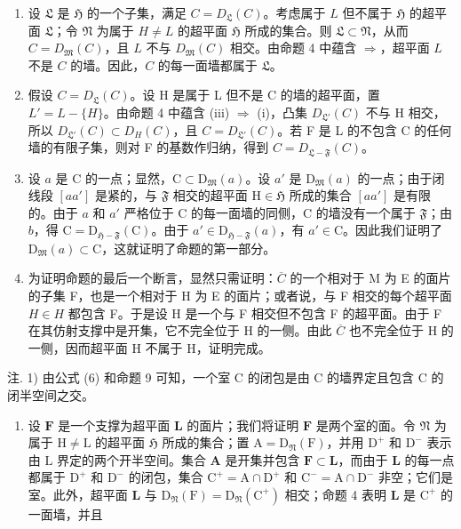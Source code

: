 \begin{enumerate}
\def\labelenumi{\alph{enumi})}
\item
  设 \(\mathfrak{L}\) 是 \(\mathfrak{H}\) 的一个子集，满足 \(C = D_{\mathfrak{L}}(C)\)。考虑属于 \(L\) 但不属于 \(\mathfrak{H}\) 的超平面 \(\mathfrak{L}\)；令 \(\mathfrak{N}\) 为属于 \(H \neq L\) 的超平面 \(\mathfrak{H}\) 所成的集合。则 \(\mathfrak{L} \subset \mathfrak{N}\)，从而 \(C = D_{\mathfrak{M}}(C)\)，且 \(L\) 不与 \(D_{\mathfrak{M}}(C)\) 相交。由命题 4 中蕴含 \(\Longrightarrow\)，超平面 \(L\) 不是 \(C\) 的墙。因此，\(C\) 的每一面墙都属于 \(\mathfrak{L}\)。
\item
  假设 \(C = D_{\mathfrak{L}}(C)\)。设 H 是属于 L 但不是 C 的墙的超平面，置 \(L' = L - \{H\}\)。由命题 4 中蕴含 (iii) \(\Longrightarrow\) (i)，凸集 \(D_{\mathfrak{L}'}(C)\) 不与 H 相交，所以 \(D_{\mathfrak{L}'}(C) \subset D_{H}(C)\)，且 \(C = D_{\mathfrak{L}'}(C)\)。若 F 是 L 的不包含 C 的任何墙的有限子集，则对 F 的基数作归纳，得到 \(C = D_{\mathfrak{L} - \mathfrak{F}}(C)\)。
\item
  设 \(a\) 是 C 的一点；显然，\(\mathrm{C} \subset \mathrm{D}_{\mathfrak{M}}(a)\)。设 \(a'\) 是 \(\mathrm{D}_{\mathfrak{M}}(a)\) 的一点；由于闭线段 \([aa']\) 是紧的，与 \(\mathfrak{F}\) 相交的超平面 \(\mathrm{H} \in \mathfrak{H}\) 所成的集合 \([aa']\) 是有限的。由于 \(a\) 和 \(a'\) 严格位于 C 的每一面墙的同侧，C 的墙没有一个属于 \(\mathfrak{F}\)；由 \(b\)，得 \(\mathrm{C} = \mathrm{D}_{\mathfrak{H}-\mathfrak{F}}(\mathrm{C})\)。由于 \(a' \in \mathrm{D}_{\mathfrak{H}-\mathfrak{F}}(a)\)，有 \(a' \in \mathrm{C}\)。因此我们证明了 \(\mathrm{D}_{\mathfrak{M}}(a) \subset \mathrm{C}\)，这就证明了命题的第一部分。
\item
  为证明命题的最后一个断言，显然只需证明：\(\overline{C}\) 的一个相对于 M 为 E 的面片的子集 F，也是一个相对于 H 为 E 的面片；或者说，与 F 相交的每个超平面 \(H \in H\) 都包含 F。于是设 H 是一个与 F 相交但不包含 F 的超平面。由于 F 在其仿射支撑中是开集，它不完全位于 H 的一侧。由此 \(\overline{C}\) 也不完全位于 H 的一侧，因而超平面 H 不属于 H，证明完成。
\end{enumerate}

注. 1) 由公式 (6) 和命题 9 可知，一个室 C 的闭包是由 C 的墙界定且包含 C 的闭半空间之交。

\begin{enumerate}
\def\labelenumi{\arabic{enumi})}
\setcounter{enumi}{1}
\tightlist
\item
  设 \(\mathbf{F}\) 是一个支撑为超平面 \(\mathbf{L}\) 的面片；我们将证明 \(\mathbf{F}\) 是两个室的面。令 \(\mathfrak{N}\) 为属于 \(\mathrm{H} \neq \mathrm{L}\) 的超平面 \(\mathfrak{H}\) 所成的集合；置 \(\mathrm{A} = \mathrm{D}_{\mathfrak{N}}(\mathrm{F})\)，并用 \(\mathrm{D}^{+}\) 和 \(\mathrm{D}^{-}\) 表示由 \(\mathrm{L}\) 界定的两个开半空间。集合 \(\mathbf{A}\) 是开集并包含 \(\mathbf{F} \subset \mathbf{L}\)，而由于 \(\mathbf{L}\) 的每一点都属于 \(\mathrm{D}^{+}\) 和 \(\mathrm{D}^{-}\) 的闭包，集合 \(\mathrm{C}^{+} = \mathrm{A} \cap \mathrm{D}^{+}\) 和 \(\mathrm{C}^{-} = \mathrm{A} \cap \mathrm{D}^{-}\) 非空；它们是室。此外，超平面 \(\mathbf{L}\) 与 \(\mathrm{D}_{\mathfrak{N}}(\mathrm{F}) = \mathrm{D}_{\mathfrak{N}}(\mathrm{C}^{+})\) 相交；命题 4 表明 \(\mathbf{L}\) 是 \(\mathrm{C}^{+}\) 的一面墙，并且
\end{enumerate}

